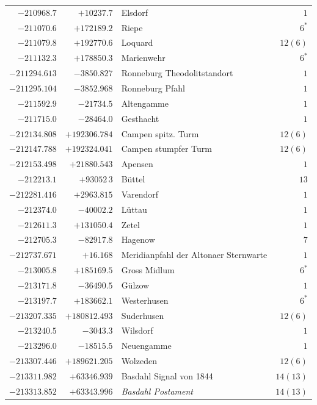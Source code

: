 \begin{center}
\begin{tabular}{r|r|p{170pt}|r}
\(-210968.7\)&\(+10237.7\)&Elsdorf&\(1\)\\
\(-211070.6\)&\(+172189.2\)&Riepe&\(6^{*}\)\\
\(-211079.8\)&\(+192770.6\)&Loquard&\(12 (6)\)\\
\(-211132.3\)&\(+178850.3\)&Marienwehr&\(6^{*}\)\\
\(-211294.613\)&\(-3850.827\)&Ronneburg Theodolitstandort&\(1\)\\
\(-211295.104\)&\(-3852.968\)&Ronneburg Pfahl&\(1\)\\
\(-211592.9\)&\(-21734.5\)&Altengamme&\(1\)\\
\(-211715.0\)&\(-28464.0\)&Gesthacht&\(1\)\\
\(-212134.808\)&\(+192306.784\)&Campen spitz. Turm&\(12 (6)\)\\
\(-212147.788\)&\(+192324.041\)&Campen stumpfer Turm&\(12 (6)\)\\
\(-212153.498\)&\(+21880.543\)&Apensen&\(1\)\\
\(-212213.1\)&\(+93052\,3\)&Büttel&\(13\)\\
\(-212281.416\)&\(+2963.815\)&Varendorf&\(1\)\\
\(-212374.0\)&\(-40002.2\)&Lüttau&\(1\)\\
\(-212611.3\)&\(+131050.4\)&Zetel&\(1\)\\
\(-212705.3\)&\(-82917.8\)&Hagenow&\(7\)\\
\(-212737.671\)&\(+16.168\)&Meridianpfahl der Altonaer Sternwarte&\(1\)\\
\(-213005.8\)&\(+185169.5\)&Gross Midlum&\(6^{*}\)\\
\(-213171.8\)&\(-36490.5\)&Gülzow&\(1\)\\
\(-213197.7\)&\(+183662.1\)&Westerhusen&\(6^{*}\)\\
\(-213207.335\)&\(+180812.493\)&Suderhusen&\(12 (6)\)\\
\(-213240.5\)&\(-3043.3\)&Wilsdorf&\(1\)\\
\(-213296.0\)&\(-18515.5\)&Neuengamme&\(1\)\\
\(-213307.446\)&\(+189621.205\)&Wolzeden&\(12 (6)\)\\
\(-213311.982\)&\(+63346.939\)&Basdahl Signal von 1844&\(14(13)\)\\
\(-213313.852\)&\(+63343.996\)&\textit{Basdahl Postament}&\(14(13)\)\\
\hline\end{tabular}\endgroup\end{center}
